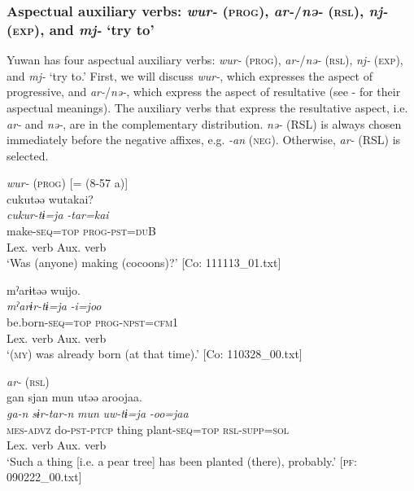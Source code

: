 \subsubsection{Aspectual auxiliary verbs: \textit{wur-} (\textsc{prog}), \textit{ar-}/\textit{nə-} (\textsc{rsl}), \textit{nj-} (\textsc{exp}), and \textit{mj-} ‘try to’}\label{sec:9.1.1.1}

Yuwan has four aspectual auxiliary verbs: \textit{wur-} (\textsc{prog}), \textit{ar-}/\textit{nə-} (\textsc{rsl}), \textit{nj-} (\textsc{exp}), and \textit{mj-} ‘try to.’ First, we will discuss \textit{wur-}, which expresses the aspect of progressive, and \textit{ar-}/\textit{nə-}, which express the aspect of resultative (see  -  for their aspectual meanings). The auxiliary verbs that express the resultative aspect, i.e. \textit{ar-} and \textit{nə-}, are in the complementary distribution. \textit{nə-} (RSL) is always chosen immediately before the negative affixes, e.g. \textit{{}-an} (\textsc{neg}). Otherwise, \textit{ar-} (RSL) is selected.

\ea   \textit{wur-} (\textsc{prog}) \label{ex:9.7}
  \ea \label{ex:9.7a} [= (8-57 a)]\\
   \gllll     cukutəə  wutakai?\\
      \textit{cukur-tɨ=ja}  \textit{-tar=kai}\\
      make-\textsc{seq}=\textsc{top}  \textsc{prog}-\textsc{pst}=\textsc{du}B\\
      Lex. verb  Aux. verb\\
      \glt       ‘Was (anyone) making (cocoons)?’ [Co: 111113\_01.txt]

\ex \label{ex:9.7b} %
    \gllll  mˀarɨtəə  wuijo.\\
      \textit{mˀarɨr-tɨ=ja}  \textit{-i=joo}\\
      be.born-\textsc{seq}=\textsc{top}  \textsc{prog}-\textsc{npst}=\textsc{cfm}1\\
      Lex. verb  Aux. verb\\
      \glt       ‘(\textsc{my}) was already born (at that time).’ [Co: 110328\_00.txt]

\ex \textit{ar-} (\textsc{rsl})\label{ex:9.7c}\\
    \gllll     gan  sjan  mun  utəə  aroojaa.\\
      \textit{ga-n}  \textit{sɨr-tar-n}  \textit{mun}  \textit{uw-tɨ=ja}  \textit{-oo=jaa}\\
      \textsc{mes}-\textsc{advz}  do-\textsc{pst}-\textsc{ptcp}  thing  plant-\textsc{seq}=\textsc{top}  \textsc{rsl}-\textsc{supp}=\textsc{sol}\\
            Lex. verb  Aux. verb\\
      \glt       ‘Such a thing [i.e. a pear tree] has been planted (there), probably.’ [\textsc{pf}: 090222\_00.txt]
  
